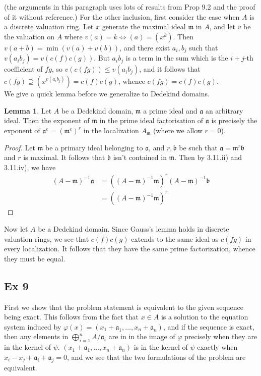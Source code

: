 \documentclass{article}
\let\temp\phi
\let\phi\varphi
\let\varphi\temp
\theoremstyle{definition}
\newtheorem{lemma}[theorem]{Lemma}
\begin{document}
(the arguments in this paragraph uses lots of results from Prop 9.2 and the
proof of it without reference.) For the other inclusion, first consider the
case when $A$ is a discrete valuation ring. Let $x$ generate the maximal ideal
$\mathfrak{m}$ in $A$, and let $v$ be the valuation on $A$ where $v(a) = k
\Leftrightarrow (a) = (x^{k})$. Then $v(a + b) = \min(v(a) + v(b))$, and there
exist $a_i, b_j$ such that $v(a_ib_j) = v(c(f)c(g))$. But $a_ib_j$ is a term in
the sum which is the $i + j$-th coefficient of $fg$, so $v(c(fg)) \leq
v(a_ib_j)$, and it follows that $c(fg) \supseteq (x^{v(a_ib_j)}) = c(f)c(g)$,
whence $c(fg) = c(f)c(g)$. \\

We give a quick lemma before we generalize to Dedekind domains.

\begin{lemma}
	Let $A$ be a Dedekind domain, $\mathfrak{m}$ a prime ideal and
	$\mathfrak{a}$ an arbitrary ideal. Then the exponent of $\mathfrak{m}$ in
	the prime ideal factorisation of $\mathfrak{a}$ is precisely the exponent
	of $\mathfrak{a}^{e} = (\mathfrak{m}^{e})^{r}$ in the localization
	$A_{\mathfrak{m}}$ (where we allow $r = 0$).
\end{lemma}
\begin{proof}
	Let $\mathfrak{m}$ be a primary ideal belonging to $\mathfrak{a}$, and $r,
	\mathfrak{b}$ be such that $\mathfrak{a} = \mathfrak{m}^{r}\mathfrak{b}$
	and $r$ is maximal. It follows that $\mathfrak{b}$ isn't contained in
	$\mathfrak{m}$. Then by 3.11.ii) and 3.11.iv), we have 
	\begin{align*}
		(A - \mathfrak{m})^{-1}\mathfrak{a}
		&=
		((A - \mathfrak{m})^{-1}\mathfrak{m})^{r}
		(A - \mathfrak{m})^{-1}\mathfrak{b} \\
		&=
		((A - \mathfrak{m})^{-1}\mathfrak{m})^{r}
	\end{align*}
\end{proof}

Now let $A$ be a Dedekind domain. Since Gauss's lemma holds
in discrete valuation rings, we see that $c(f)c(g)$ extends to
the same ideal as $c(fg)$ in every localization. It follows that 
they have the same prime factorization, whence they must be equal.


\subsection*{Ex 9}

First we show that the problem statement is equivalent to the given sequence
being exact. This follows from the fact that $x \in A$ is a solution to the
equation system induced by $\phi(x) = (x_1 + \mathfrak{a}_1, \ldots, x_n +
\mathfrak{a}_n)$, and if the sequence is exact, then any elements in
$\bigoplus_{i=1}^{n} A/\mathfrak{a}_i$ are in in the image of $\phi$ precisely
when they are in the kernel of $\psi$. $(x_1 + \mathfrak{a}_1, \ldots, x_n +
\mathfrak{a}_n)$ is in the kernel of $\psi$ exactly when $x_i - x_j +
\mathfrak{a}_i + \mathfrak{a}_j = 0$, and we see that the two formulations of
the problem are equivalent. \\
\end{document}
